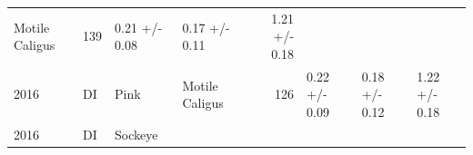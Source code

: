 \documentclass[fleqn,10pt]{wlpeerj} %
\begin{document}
\begin{longtable}[]{@{}llllrlll@{}}
\begin{minipage}[t]{0.11\columnwidth}
Motile Caligus\strut
\end{minipage} & \begin{minipage}[t]{0.04\columnwidth}\raggedleft\strut
139\strut
\end{minipage} & \begin{minipage}[t]{0.14\columnwidth}\raggedright\strut
0.21 +/- 0.08\strut
\end{minipage} & \begin{minipage}[t]{0.14\columnwidth}\raggedright\strut
0.17 +/- 0.11\strut
\end{minipage} & \begin{minipage}[t]{0.14\columnwidth}\raggedright\strut
1.21 +/- 0.18\strut
\end{minipage}\tabularnewline
\begin{minipage}[t]{0.09\columnwidth}\raggedright\strut
2016\strut
\end{minipage} & \begin{minipage}[t]{0.06\columnwidth}\raggedright\strut
DI\strut
\end{minipage} & \begin{minipage}[t]{0.06\columnwidth}\raggedright\strut
Pink\strut
\end{minipage} & \begin{minipage}[t]{0.11\columnwidth}\raggedright\strut
Motile Caligus\strut
\end{minipage} & \begin{minipage}[t]{0.04\columnwidth}\raggedleft\strut
126\strut
\end{minipage} & \begin{minipage}[t]{0.14\columnwidth}\raggedright\strut
0.22 +/- 0.09\strut
\end{minipage} & \begin{minipage}[t]{0.14\columnwidth}\raggedright\strut
0.18 +/- 0.12\strut
\end{minipage} & \begin{minipage}[t]{0.14\columnwidth}\raggedright\strut
1.22 +/- 0.18\strut
\end{minipage}\tabularnewline
\begin{minipage}[t]{0.09\columnwidth}\raggedright\strut
2016\strut
\end{minipage} & \begin{minipage}[t]{0.06\columnwidth}\raggedright\strut
DI\strut
\end{minipage} & \begin{minipage}[t]{0.06\columnwidth}\raggedright\strut
Sockeye\strut
\end{minipage} & \begin{minipage}[t]{0.11\columnwidth}\raggedright\strut

\end{minipage}
\end{longtable}
\end{document}
